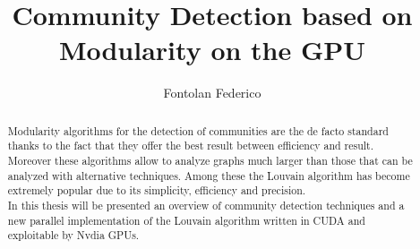 \documentclass[a4paper,titlepage]{article}
\title{Community Detection based on Modularity on the GPU}
\author{Fontolan Federico}
\begin{document}
	
	
	\begin{abstract}
		Modularity algorithms for the detection of communities are the de facto standard thanks to the fact that they offer the best result between efficiency and result. 
		Moreover these algorithms allow to analyze graphs much larger than those that can be analyzed with alternative techniques. Among these the Louvain algorithm has become extremely popular due to its simplicity, efficiency and precision.\\
		In this thesis will be presented an overview of community detection techniques and a new parallel implementation of the Louvain algorithm written in CUDA and exploitable by Nvdia GPUs.
	\end{abstract}

	\tableofcontents
	\newpage
	
	
	
	
	
	
	
	
	
	
	
	
	
	
\end{document}
